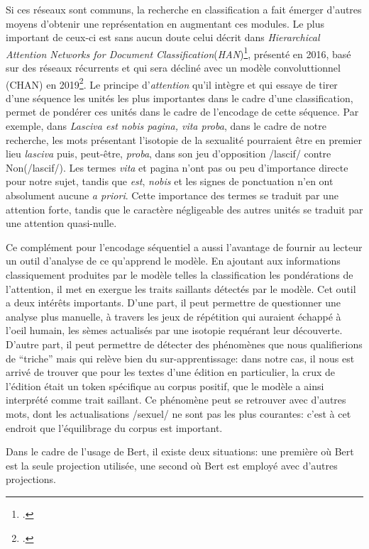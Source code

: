 Si ces réseaux sont communs, la recherche en classification a fait émerger d'autres moyens d'obtenir une représentation en augmentant ces modules. Le plus important de ceux-ci est sans aucun doute celui décrit dans \textit{Hierarchical Attention Networks for Document Classification}(\textit{HAN})\footcite{yang_hierarchical_2016}, présenté en 2016, basé sur des réseaux récurrents et qui sera décliné avec un modèle convoluttionnel (CHAN) en 2019\footcite{gao_hierarchical_2018}. Le principe d'\textit{attention} qu'il intègre et qui essaye de tirer d'une séquence les unités les plus importantes dans le cadre d'une classification, permet de pondérer ces unités dans le cadre de l'encodage de cette séquence. Par exemple, dans \textit{Lasciva est nobis pagina, vita proba}, dans le cadre de notre recherche, les mots présentant l'isotopie de la sexualité pourraient être en premier lieu \textit{lasciva} puis, peut-être, \textit{proba}, dans son jeu d'opposition /lascif/ contre Non(/lascif/). Les termes \textit{vita} et {pagina} n'ont pas ou peu d'importance directe pour notre sujet, tandis que \textit{est}, \textit{nobis} et les signes de ponctuation n'en ont absolument aucune \textit{a priori}. Cette importance des termes se traduit par une attention forte, tandis que le caractère négligeable des autres unités se traduit par une attention quasi-nulle.

Ce complément pour l'encodage séquentiel a aussi l'avantage de fournir au lecteur un outil d'analyse de ce qu'apprend le modèle. En ajoutant aux informations classiquement produites par le modèle telles la classification les pondérations de l'attention, il met en exergue les traits saillants détectés par le modèle. Cet outil a deux intérêts importants. D'une part, il peut permettre de questionner une analyse plus manuelle, à travers les jeux de répétition qui auraient échappé à l'oeil humain, les sèmes actualisés par une isotopie requérant leur découverte. D'autre part, il peut permettre de détecter des phénomènes que nous qualifierions de \enquote{triche} mais qui relève bien du sur-apprentissage: dans notre cas, il nous est arrivé de trouver que pour les textes d'une édition en particulier, la crux de l'édition était un token spécifique au corpus positif, que le modèle a ainsi interprété comme trait saillant. Ce phénomène peut se retrouver avec d'autres mots, dont les actualisations /sexuel/ ne sont pas les plus courantes: c'est à cet endroit que l'équilibrage du corpus est important.

Dans le cadre de l'usage de Bert, il existe deux situations: une première où Bert est la seule projection utilisée, une second où Bert est employé avec d'autres projections.

